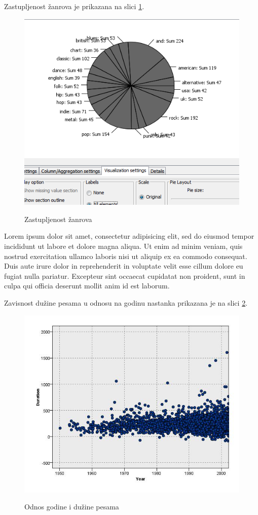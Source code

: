 Zastupljenost \v{z}anrova je prikazana na slici \ref{fig:ZastupljenostZanrova}.
\begin{figure}[H]
    \centering
    \includegraphics[scale=0.6]{resources/ZastupljenostZanrova.png}
    \label{fig:ZastupljenostZanrova}
    \caption{Zastupljenost \v{z}anrova}
\end{figure}

Lorem ipsum dolor sit amet, consectetur adipisicing elit, sed do eiusmod tempor incididunt ut labore et dolore magna aliqua. Ut enim ad minim veniam, quis nostrud exercitation ullamco laboris nisi ut aliquip ex ea commodo consequat. Duis aute irure dolor in reprehenderit in voluptate velit esse cillum dolore eu fugiat nulla pariatur. Excepteur sint occaecat cupidatat non proident, sunt in culpa qui officia deserunt mollit anim id est laborum.

Zavisnost du\v{z}ine pesama u odnosu na godinu nastanka prikazana je na slici \ref{fig:YearDuration}.
\begin{figure}[H]
    \centering
    \includegraphics[scale=0.4]{resources/year-duration.jpg}
    \label{fig:YearDuration}
    \caption{Odnos godine i du\v{z}ine pesama}
\end{figure}

